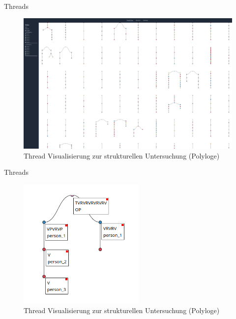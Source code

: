 \documentclass[compress,12pt]{beamer}
\begin{document}

    \begin{frame}{Threads}
        \begin{figure}
            \centering
            \includegraphics[width=\textwidth]{../images/threads-example}
            \caption{Thread Visualisierung zur strukturellen Untersuchung (Polyloge)}
            \label{fig:thread-example}
        \end{figure}
    \end{frame}

    \begin{frame}{Threads}
        \begin{figure}
            \centering
            \includegraphics[width=0.55\textwidth]{../images/single-thread-example}
            \caption{Thread Visualisierung zur strukturellen Untersuchung (Polyloge)}
            \label{fig:single-thread-example}
        \end{figure}
    \end{frame}
\end{document}
